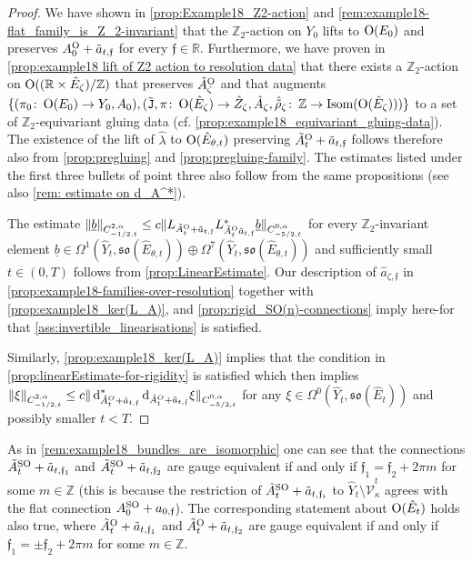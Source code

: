 \documentclass[11pt,a4paper]{scrartcl}
\newcommand*\diff{\mathop{}\!\textup{d}}
\newcommand{\col}{\colon \thinspace}
\newcommand{\VertWHt}[3]{\Vert_{C^{{#1},\alpha}_{{#2},t}{#3}}}
\newcommand{\SO}{\textup{SO}}
\renewcommand{\O}{\textup{O}}
\numberwithin{equation}{section}
\theoremstyle{plain}
\theoremstyle{definition}
\theoremstyle{remark}
\begin{document}
\begin{proof}
We have shown in \autoref{prop:Example18_Z2-action} and \autoref{rem:example18-flat_family_is_Z_2-invariant} that the $\mathbb{Z}_2$-action on $Y_0$ lifts to $\O(E_{0})$ and preserves $A_{0}^\O+\tilde{a}_{t,\mathfrak{f}}$ for every $\mathfrak{f}\in \mathbb{R}$. Furthermore, we have proven in \autoref{prop:example18 lift of Z2 action to resolution data} that there exists a $\mathbb{Z}_2$-action on $\O((\mathbb{R}\times\hat{E}_\zeta)/\mathbb{Z})$ that preserves $\hat{A}_\zeta^\O$ and that augments $\{(\pi_0 \col \O(E_0)\to Y_0, A_0),(\tilde{\mathtt{J}},\pi\col \O(\hat{E}_\zeta) \to \hat{Z}_\zeta,\hat{A}_\zeta,\hat{\tilde{\rho}}_\zeta\col \mathbb{Z}\to \textup{Isom}(\O(\hat{E}_\zeta)))\}$ to a set of $\mathbb{Z}_2$-equivariant gluing data (cf. \autoref{prop:example18_equivariant_gluing-data}). The existence of the lift of $\hat{\lambda}$ to $\O(\hat{E}_{\theta,t})$ preserving $\tilde{A}_{t}^\O + \tilde{a}_{t,\mathfrak{f}}$ follows therefore also from \autoref{prop:pregluing} and \autoref{prop:pregluing-family}. The estimates listed under the first three bullets of point three also follow from the same propositions (see also \autoref{rem: estimate on d_A^*}). 

The estimate $\Vert \underline{b} \VertWHt{2}{-1/2}{} \leq c \Vert L_{\tilde{A}_{t}^{\O}+\tilde{a}_{t,\mathfrak{f}}}L_{\tilde{A}_{t}^{\O}\tilde{a}_{t,\mathfrak{f}}}^* \underline{b} \VertWHt{0}{-5/2}{}$ for every $\mathbb{Z}_2$-invariant element $\underline{b}\in \Omega^1(\hat{Y}_t,\mathfrak{so}(\hat{E}_{\theta,t}))\oplus \Omega^7(\hat{Y}_t,\mathfrak{so}(\hat{E}_{\theta,t}))$ and sufficiently small $t\in (0,T)$ follows from \autoref{prop:LinearEstimate}. Our description of $\hat{a}_{\zeta,\mathfrak{f}}$ in \autoref{prop:example18-families-over-resolution} together with \autoref{prop:example18_ker(L_A)}, and \autoref{prop:rigid_SO(n)-connections} imply here-for that \autoref{ass:invertible_linearisations} is satisfied.

Similarly, \autoref{prop:example18_ker(L_A)} implies that the condition in \autoref{prop:linearEstimate-for-rigidity} is satisfied which then implies $\Vert \xi \VertWHt{2}{-1/2}{} \leq c \Vert \diff_{\tilde{A}^O_{t}+\tilde{a}_{t,\mathfrak{f}}}^*\diff_{\tilde{A}^O_{t}+\tilde{a}_{t,\mathfrak{f}}} \xi \VertWHt{0}{-5/2}{}$ for any $\xi \in \Omega^0(\hat{Y}_t,\mathfrak{so}(\hat{E}_t))$ and possibly smaller $t<T$.
\end{proof}
\begin{remark}
As in \autoref{rem:example18_bundles_are_isomorphic} one can see that the connections $\tilde{A}_t^{\SO}+\tilde{a}_{t,\mathfrak{f}_1}$ and $\tilde{A}_t^{\SO}+\tilde{a}_{t,\mathfrak{f}_2}$ are gauge equivalent if and only if $\mathfrak{f}_1 = \mathfrak{f}_2 + 2\pi m$ for some $m\in \mathbb{Z}$ (this is because the restriction of $\tilde{A}_{t}^{\SO}+\tilde{a}_{t,\mathfrak{f}_i}$ to $\hat{Y}_t \setminus \hat{\mathcal{V}}_{\kappa}^t$ agrees with the flat connection $A_{0}^\SO + a_{0,\mathfrak{f}}$). The corresponding statement about $\O(\hat{E}_{t})$ holds also true, where $\tilde{A}_{t}^{\O}+\tilde{a}_{t,\mathfrak{f}_1}$ and $\tilde{A}_t^\O+ \tilde{a}_{t,\mathfrak{f}_2}$ are gauge equivalent if and only if $\mathfrak{f}_1 = \pm \mathfrak{f}_2 + 2\pi m$ for some $m\in \mathbb{Z}$.
\end{remark}
\end{document}
